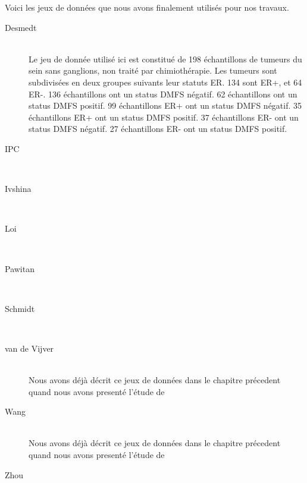       Voici les jeux de données que nous avons finalement utilisés pour nos travaux.
      \begin{description}
        \item[Desmedt \citep{Desmedt2008}]           \hfill \\
          Le jeu de donnée utilisé ici est constitué de 198 échantillons de tumeurs du sein sans ganglions, non traité par chimiothérapie.
          Les tumeurs sont subdivisées en deux groupes suivants leur statuts \acs{ER}.
          134 sont \acs{ER+}, et 64 \acs{ER-}.
          136 échantillons ont un status \acs{DMFS} négatif.
          62 échantillons ont un status \acs{DMFS} positif.
          99 échantillons \acs{ER+} ont un status \acs{DMFS} négatif.
          35 échantillons \acs{ER+} ont un status \acs{DMFS} positif.
          37 échantillons \acs{ER-} ont un status \acs{DMFS} négatif.
          27 échantillons \acs{ER-} ont un status \acs{DMFS} positif.
        \item[IPC \citep{Sabatier2011}]               \hfill \\
        \item[Ivshina \citep{Ivshina2006}]            \hfill \\
        \item[Loi \citep{Loi2008}]                    \hfill \\
        \item[Pawitan \citep{Pawitan2005}]            \hfill \\
        \item[Schmidt \citep{Schmidt2008}]            \hfill \\
        \item[van de Vijver \citep{vandevijver2002}]  \hfill \\
          Nous avons déjà décrit ce jeux de données dans le chapitre précedent quand nous avons presenté l'étude de \citeauthor{vandevijver2002}
        \item[Wang \citep{Wang2005}]                  \hfill \\
          Nous avons déjà décrit ce jeux de données dans le chapitre précedent quand nous avons presenté l'étude de \citeauthor{Wang2005}
        \item[Zhou \citep{Zhou2007}]                  \hfill \\
      \end{description}

